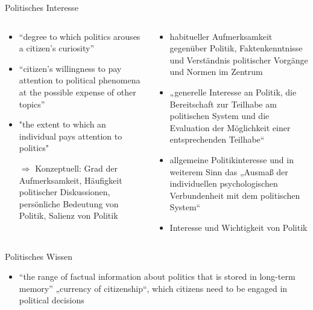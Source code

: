 \documentclass[11pt]{beamer}
\begin{document}
\begin{frame}[t]{Politisches Interesse}
	\begin{columns}
		\begin{column}[t]{.5\textwidth}
			\begin{itemize}
				\item[]
				\item “degree to which politics arouses a citizen’s curiosity” \parencite[278]{vanDeth1990}
				\item “citizen’s willingness to pay attention to political phenomena at the possible expense of other topics” \parencite[1122]{Lupia2005}
				\item "the extent to which an individual pays attention to politics" \parencite[21]{Zaller1992}
				\item[$\Rightarrow$] Konzeptuell: Grad der Aufmerksamkeit, Häufigkeit politischer Diskussionen, persönliche Bedeutung von Politik, Salienz von Politik
			\end{itemize}
		\end{column}
		\begin{column}[t]{.5\textwidth}
			\begin{itemize}
				\item habitueller Aufmerksamkeit gegenüber Politik, Faktenkenntnisse und Verständnis politischer Vorgänge und Normen im Zentrum \parencite{Zaller1992}
				\item „generelle Interesse an Politik, die Bereitschaft zur Teilhabe am politischen System und die Evaluation der Möglichkeit einer entsprechenden Teilhabe“ \parencite[72]{Pickel2002}
				\item allgemeine Politikinteresse und in weiterem Sinn das „Ausmaß der individuellen psychologischen Verbundenheit mit dem politischen System“ \parencite[72f]{Caballero2009}
				\item Interesse und Wichtigkeit von Politik \parencite{Martin2007}
			\end{itemize}
		\end{column}
	\end{columns}
\end{frame}


\begin{frame}{Politisches Wissen}
	\begin{itemize}
		\item “the range of factual information about politics that is stored in long-term memory” \parencite[10]{DelliCarpini1996}
„currency of citizenship“, which citizens need to be engaged in political decisions \parencite[8]{DelliCarpini1996}
	\end{itemize}
\end{frame}
\end{document}

